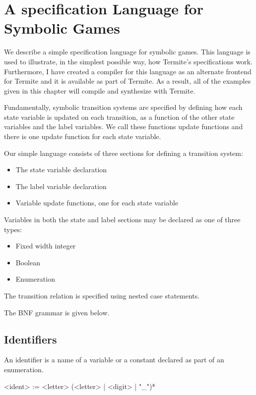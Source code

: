 \section{A specification Language for Symbolic Games}

We describe a simple specification language for symbolic games. This language is used to illustrate, in the simplest possible way, how Termite's specifications work. Furthermore, I have created a compiler for this language as an alternate frontend for Termite and it is available as part of Termite. As a result, all of the examples given in this chapter will compile and synthesize with Termite.

Fundamentally, symbolic transition systems are specified by defining how each state variable is updated on each transition, as a function of the other state variables and the label variables. We call these functions update functions and there is one update function for each state variable. 

Our simple language consists of three sections for defining a transition system:
\begin{itemize}
    \item The state variable declaration
    \item The label variable declaration
    \item Variable update functions, one for each state variable
\end{itemize}

Variables in both the state and label sections may be declared as one of three types:
\begin{itemize}
    \item Fixed width integer
    \item Boolean
    \item Enumeration
\end{itemize}

The transition relation is specified using nested case statements.

The BNF grammar is given below.

\subsection{Identifiers}

An identifier is a name of a variable or a constant declared as part of an enumeration.

\begin{bnflisting}
    <ident>    := <letter> (<letter> | <digit> | "_")*
\end{bnflisting}

